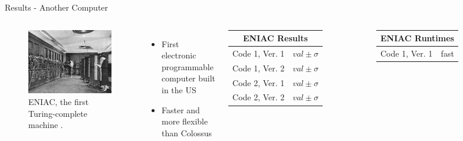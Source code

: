 \documentclass[final]{beamer}
\begin{document}
\begin{frame}{}
\begin{columns}[t]
      \begin{column}{.3\linewidth}
		\begin{block}{Results - Another Computer}
\begin{columns}
	\begin{figure}[h!]
	\includegraphics[width=5.5in]{Eniac.jpg}
	\caption{ENIAC, the first Turing-complete machine \cite{wiki:comp}.}
	\end{figure}
	\begin{itemize}
	\item{First electronic programmable computer built in the US}
	\item{Faster and more flexible than Colossus \cite{wiki:comp}}
	\end{itemize}
	\begin{table}[h]
	\begin{tabular}{ll}
	\multicolumn{2}{c}{ENIAC Results} \\ \hline
	Code 1, Ver. 1 & $val \pm \sigma$ \\
	Code 1, Ver. 2 & $val \pm \sigma$ \\
	Code 2, Ver. 1 & $val \pm \sigma$ \\
	Code 2, Ver. 2 & $val \pm \sigma$
	\end{tabular}
	\end{table}
	\begin{table}[h]
	\begin{tabular}{ll}
	\multicolumn{2}{c}{ENIAC Runtimes} \\ \hline
	Code 1, Ver. 1 & fast \\

\end{tabular}
\end{table}
\end{columns}
\end{block}
\end{column}
\end{columns}
\end{frame}
\end{document}

